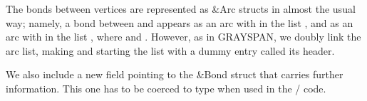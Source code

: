 The bonds between vertices are represented as \&{Arc}
structs in
almost the usual way; namely, a bond between  and  appears as
an arc  with  in the list , and as an arc 
with  in the list , where  and .
However, as in {\mc GRAYSPAN}, we doubly link the arc list,
making  and
starting the list with
a dummy entry called its header.

We also include a new field
 pointing to the \&{Bond} struct that carries further
information.
This one has to be coerced to type  when used in the %
\CEE/ code.

